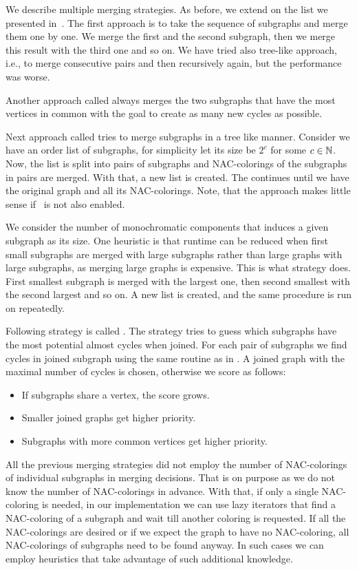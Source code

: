 We describe multiple merging strategies.
As before, we extend on the list we presented in~\cite{my_paper}.
The first approach \MergeLinear{} is
to take the sequence of subgraphs and merge them one by one.
We merge the first and the second subgraph, then we merge this result with the
third one and so on. We have tried also tree-like approach, i.e., to merge consecutive pairs
and then recursively again, but the performance was worse.

Another approach called \SharedVertices{} always merges the two subgraphs that
have the most vertices in common with the goal
to create as many new cycles as possible.

Next approach called \Log{} tries to merge subgraphs in a tree like manner.
Consider we have an order list of subgraphs,
for simplicity let its size be \( 2^c \) for some \( c \in \mathbb{N} \).
Now, the list is split into pairs of subgraphs and NAC-colorings
of the subgraphs in pairs are merged. With that, a new list is created.
The continues until we have the original graph and all its NAC-colorings.
Note, that the approach makes little sense if~
is not also enabled.

We consider the number of monochromatic components
that induces a given subgraph as its size.
One heuristic is that runtime can be reduced
when first small subgraphs are merged with large subgraphs
rather than large graphs with large subgraphs, as merging large graphs is expensive.
This is what \MinMax{} strategy does.
First smallest subgraph is merged with the largest one,
then second smallest with the second largest and so on.
A new list is created, and the same procedure is run on repeatedly.

Following strategy is called \PromissingCycles{}.
The strategy tries to guess which subgraphs
have the most potential almost cycles when joined.
For each pair of subgraphs we find cycles in joined subgraph using
the same routine as in .
A joined graph with the maximal number of cycles is chosen,
otherwise we score as follows:
%
\begin{itemize}
	\item If subgraphs share a vertex, the score grows.
	\item Smaller joined graphs get higher priority.
	\item Subgraphs with more common vertices get higher priority.
\end{itemize}
%

All the previous merging strategies did not employ the number of NAC-colorings
of individual subgraphs in merging decisions.
That is on purpose as we do not know the number of NAC-colorings in advance.
With that, if only a single NAC-coloring is needed,
in our implementation we can use lazy iterators that
find a NAC-coloring of a subgraph and wait till another coloring is requested.
If all the NAC-colorings are desired or if we expect the graph to have no NAC-coloring,
all NAC-colorings of subgraphs need to be found anyway.
In such cases we can employ heuristics that take advantage of such additional knowledge.

